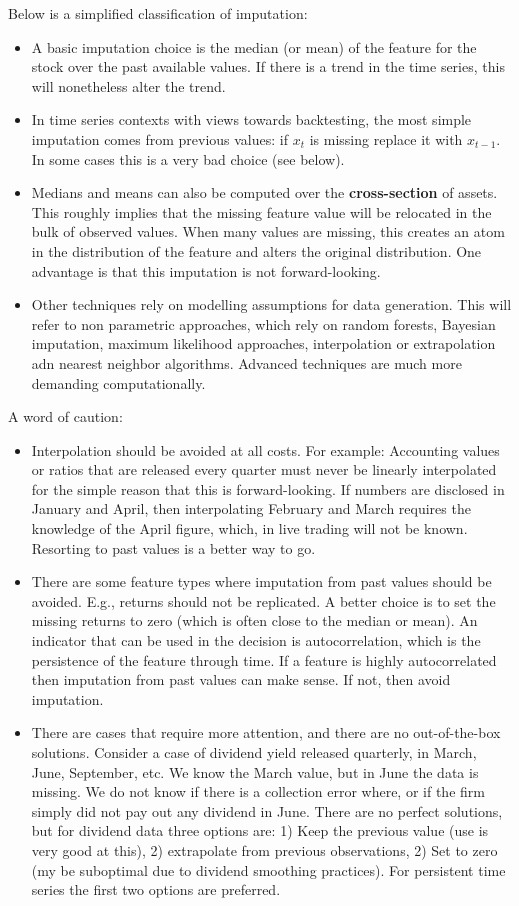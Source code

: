 Below is a simplified classification of imputation:
\begin{itemize}
    \item A basic imputation choice is the median (or mean) of the feature for the stock over the past available values. If there is a trend in the time series, this will nonetheless alter the trend. 
    \item In time series contexts with views towards backtesting, the most simple imputation comes from previous values: if $x_{t}$ is missing replace it with $x_{t-1}$. In some cases this is a very bad choice (see below).
    \item Medians and means can also be computed over the \textbf{cross-section} of assets. This roughly implies that the missing feature value will be relocated in the bulk of observed values. When many values are missing, this creates an atom in the distribution of the feature and alters the original distribution. One advantage is that this imputation is not forward-looking. 
    \item Other techniques rely on modelling assumptions for data generation. This will refer to non parametric approaches, which rely on random forests, Bayesian imputation, maximum likelihood approaches, interpolation or extrapolation adn nearest neighbor algorithms. Advanced techniques are much more demanding computationally.
\end{itemize}

A word of caution: 
\begin{itemize}
    \item Interpolation should be avoided at all costs. For example: Accounting values or ratios that are released every quarter must never be linearly interpolated for the simple reason that this is forward-looking. If numbers are disclosed in January and April, then interpolating February and March requires the knowledge of the April figure, which, in live trading will not be known. Resorting to past values is a better way to go.
    \item There are some feature types where imputation from past values should be avoided. E.g., returns should not be replicated. A better choice is to set the missing returns to zero (which is often close to the median or mean). An indicator that can be used in the decision is autocorrelation, which is the persistence of the feature through time. If a feature is highly autocorrelated then imputation from past values can make sense. If not, then avoid imputation. 
    \item There are cases that require more attention, and there are no out-of-the-box solutions. Consider a case of dividend yield released quarterly, in March, June, September, etc. We know the March value, but in June the data is missing. We do not know if there is a collection error where, or if the firm simply did not pay out any dividend in June. There are no perfect solutions, but for dividend data three options are: 1) Keep the previous value (use  is very good at this), 2) extrapolate from previous observations, 2) Set to zero (my be suboptimal due to dividend smoothing practices). For persistent time series the first two options are preferred.
\end{itemize}

